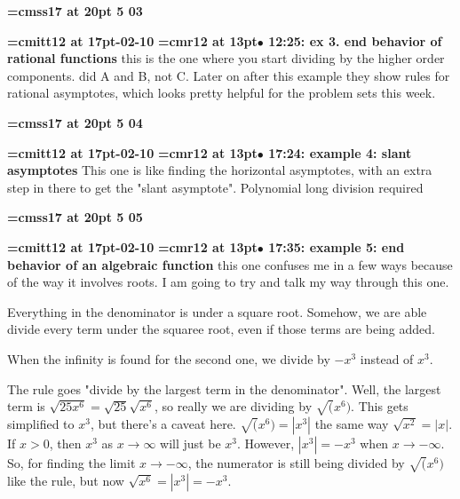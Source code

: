 {\medskip\noindent\bf\font\titlefont=cmss17 at 20pt 5 03}\medskip

{\medskip\noindent\bf\font\titlefont=cmitt12 at 17pt-02-10}\medskip
{\smallskip\noindent\bf\font\titlefont=cmr12 at 13pt\titlefont $\bullet$ 12:25: ex 3. end behavior of rational functions}\smallskip
this is the one where you start dividing by the higher order components. did A and B, not C. Later on after this example they show rules for rational asymptotes, which looks pretty helpful for the problem sets this week.
\par

{\medskip\noindent\bf\font\titlefont=cmss17 at 20pt 5 04}\medskip

{\medskip\noindent\bf\font\titlefont=cmitt12 at 17pt-02-10}\medskip
{\smallskip\noindent\bf\font\titlefont=cmr12 at 13pt\titlefont $\bullet$ 17:24: example 4: slant asymptotes}\smallskip
This one is like finding the horizontal asymptotes, with an extra step in there to get the "slant asymptote". Polynomial long division required
\par

{\medskip\noindent\bf\font\titlefont=cmss17 at 20pt 5 05}\medskip

{\medskip\noindent\bf\font\titlefont=cmitt12 at 17pt-02-10}\medskip
{\smallskip\noindent\bf\font\titlefont=cmr12 at 13pt\titlefont $\bullet$ 17:35: example 5: end behavior of an algebraic function}\smallskip
this one confuses me in a few ways because of the way it involves roots. I am going to try and  talk my way through this one.
\par

Everything in the denominator is under a square root. Somehow, we are able divide every term under the squaree root, even if those terms are being added.
\par

When the infinity is found for the second one, we divide by $-x^3$ instead of $x^3$.
\par

The rule goes "divide by the largest term in the denominator". Well, the largest term is $\sqrt{25x^6} = \sqrt{25}\sqrt{x^6}$, so really we are dividing by $\sqrt(x^6)$. This gets simplified to $x^3$, but there's a caveat here. $\sqrt(x^6) = |x^3|$ the same way $\sqrt{x^2} = |x|$. If $x > 0$, then $x^3$ as $x \to \infty$ will just be $x^3$. However, $|x^3| = -x^3$ when $x \to -\infty$. So, for finding the limit $x \to -\infty$, the numerator is still being divided by $\sqrt(x^6)$ like the rule, but now $\sqrt{x^6}=|x^3|=-x^3$.
\par

